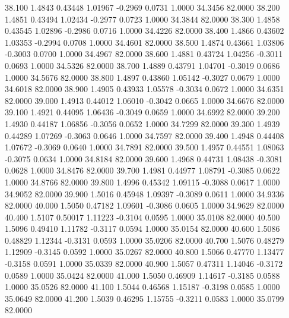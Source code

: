   38.100   1.4843   0.43448   1.01967  -0.2969   0.0731   1.0000  34.3456  82.0000
  38.200   1.4851   0.43494   1.02434  -0.2977   0.0723   1.0000  34.3844  82.0000
  38.300   1.4858   0.43545   1.02896  -0.2986   0.0716   1.0000  34.4226  82.0000
  38.400   1.4866   0.43602   1.03353  -0.2994   0.0708   1.0000  34.4601  82.0000
  38.500   1.4874   0.43661   1.03806  -0.3003   0.0700   1.0000  34.4967  82.0000
  38.600   1.4881   0.43724   1.04256  -0.3011   0.0693   1.0000  34.5326  82.0000
  38.700   1.4889   0.43791   1.04701  -0.3019   0.0686   1.0000  34.5676  82.0000
  38.800   1.4897   0.43860   1.05142  -0.3027   0.0679   1.0000  34.6018  82.0000
  38.900   1.4905   0.43933   1.05578  -0.3034   0.0672   1.0000  34.6351  82.0000
  39.000   1.4913   0.44012   1.06010  -0.3042   0.0665   1.0000  34.6676  82.0000
  39.100   1.4921   0.44095   1.06436  -0.3049   0.0659   1.0000  34.6992  82.0000
  39.200   1.4930   0.44187   1.06856  -0.3056   0.0652   1.0000  34.7299  82.0000
  39.300   1.4939   0.44289   1.07269  -0.3063   0.0646   1.0000  34.7597  82.0000
  39.400   1.4948   0.44408   1.07672  -0.3069   0.0640   1.0000  34.7891  82.0000
  39.500   1.4957   0.44551   1.08063  -0.3075   0.0634   1.0000  34.8184  82.0000
  39.600   1.4968   0.44731   1.08438  -0.3081   0.0628   1.0000  34.8476  82.0000
  39.700   1.4981   0.44977   1.08791  -0.3085   0.0622   1.0000  34.8766  82.0000
  39.800   1.4996   0.45342   1.09115  -0.3088   0.0617   1.0000  34.9052  82.0000
  39.900   1.5016   0.45948   1.09397  -0.3089   0.0611   1.0000  34.9336  82.0000
  40.000   1.5050   0.47182   1.09601  -0.3086   0.0605   1.0000  34.9629  82.0000
  40.400   1.5107   0.50017   1.11223  -0.3104   0.0595   1.0000  35.0108  82.0000
  40.500   1.5096   0.49410   1.11782  -0.3117   0.0594   1.0000  35.0154  82.0000
  40.600   1.5086   0.48829   1.12344  -0.3131   0.0593   1.0000  35.0206  82.0000
  40.700   1.5076   0.48279   1.12909  -0.3145   0.0592   1.0000  35.0267  82.0000
  40.800   1.5066   0.47770   1.13477  -0.3158   0.0591   1.0000  35.0339  82.0000
  40.900   1.5057   0.47311   1.14046  -0.3172   0.0589   1.0000  35.0424  82.0000
  41.000   1.5050   0.46909   1.14617  -0.3185   0.0588   1.0000  35.0526  82.0000
  41.100   1.5044   0.46568   1.15187  -0.3198   0.0585   1.0000  35.0649  82.0000
  41.200   1.5039   0.46295   1.15755  -0.3211   0.0583   1.0000  35.0799  82.0000
